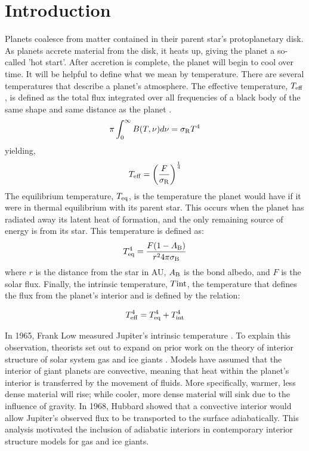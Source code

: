 \documentclass[11pt]{ucscthesisbs}
\begin{document}
\chapter{Introduction}
Planets coalesce from matter contained in their parent star's protoplanetary disk. As planets accrete material from the disk, it heats up, giving the planet a so-called 'hot start'. After accretion is complete, the planet will begin to cool over time. It will be helpful to define what we mean by temperature. There are several temperatures that describe a planet's atmosphere. The effective temperature, $T_{\rm eff}$, is defined as the total flux integrated over all frequencies of a black body of the same shape and same distance as the planet \citep{seager_2010}.
\begin{equation}
    \pi \int_{0}^{\infty} B(T, \nu) d\nu = \sigma_{\rm R}T^{4}
  \label{eq:effective_temp_integral}
\end{equation}  
yielding,
\begin{equation}
    T_{\rm eff} = \bigg(\frac{F}{\sigma_{\rm R}}\bigg)^{\frac{1}{4}} 
  \label{eq:effective_temp}
\end{equation} 
The equilibrium temperature, $T_{\rm eq}$, is the temperature the planet would have if it were in thermal equilibrium with its parent star. This occurs when the planet has radiated away its latent heat of formation, and the only remaining source of energy is from its star. This temperature is defined as:
\begin{equation}
    T_{\rm eq}^4 = \frac{F(1-A_{\rm B})}{r^{2} 4 \pi \sigma_{\rm B}}
  \label{eq:equilibrium_temp}
\end{equation} 
where $r$ is the distance from the star in AU, $A_{\rm B}$ is the bond albedo, and $F$ is the solar flux. Finally, the intrinsic temperature, $T{\rm int}$, the temperature that defines the flux from the planet's interior and is defined by the relation:

\begin{equation}
    T_{\rm eff}^4 =  T_{\rm eq}^4 +  T_{\rm int}^4
  \label{eq:effective_temp}
\end{equation} 

In 1965, Frank Low measured Jupiter's intrinsic temperature \citep{low_1966}. To explain this observation, theorists set out to expand on prior work \citep{demarcus_1958} on the theory of interior structure of solar system gas and ice giants \citep{hubbard_1968, smoluchowski_1967,hubbard_1977, hubbard_1977_2, podolak_1991}. Models have assumed that the interior of giant planets are convective, meaning that heat within the planet's interior is transferred by the movement of fluids. More specifically, warmer, less dense material will rise; while cooler, more dense material will sink due to the influence of gravity. In 1968, Hubbard showed that a convective interior would allow Jupiter's observed flux to be transported to the surface adiabatically. This analysis motivated the inclusion of adiabatic interiors in contemporary interior structure models for gas and ice giants.
\end{document}
